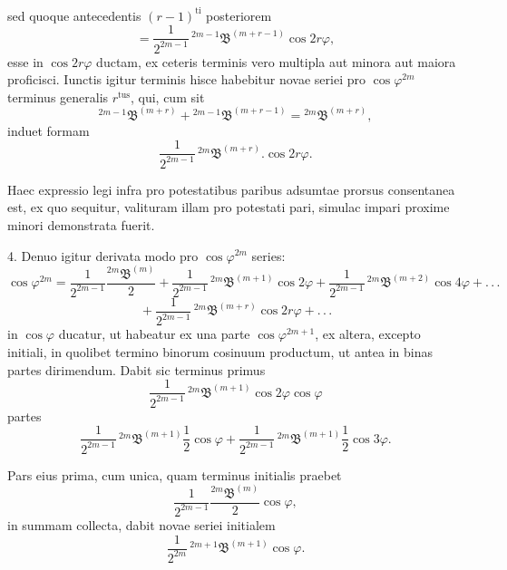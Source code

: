 sed quoque antecedentis $(r-1)^{\text{ti}}$ posteriorem
\[
= \frac{1}{2^{2m-1}}\,{}^{2m-1}\mathfrak{B}^{(m+r-1)}\cos 2r\varphi,
\]
esse in $\cos 2r\varphi$ ductam, ex ceteris terminis vero multipla aut minora
aut maiora proficisci. Iunctis igitur terminis hisce habebitur novae seriei
pro $\cos\varphi^{2m}$ terminus generalis $r^{\text{tus}}$, qui, cum sit
\[
{}^{2m-1}\mathfrak{B}^{(m+r)} + {}^{2m-1}\mathfrak{B}^{(m+r-1)} = {}^{2m}\mathfrak{B}^{(m+r)},
\]
induet formam
\[
\frac{1}{2^{2m-1}}\,{}^{2m}\mathfrak{B}^{(m+r)} . \cos 2r\varphi.
\]

\par\noindent Haec expressio legi infra pro potestatibus paribus adsumtae prorsus
consentanea est, ex quo sequitur, valituram illam pro potestati pari, simulac
impari proxime minori demonstrata fuerit.

4. Denuo igitur derivata modo pro $\cos\varphi^{2m}$ series:
\[
\cos\varphi^{2m} = \frac{1}{2^{2m-1}}\frac{{}^{2m}\mathfrak{B}^{(m)}}{2}
+ \frac{1}{2^{2m-1}}\,{}^{2m}\mathfrak{B}^{(m+1)}\cos 2\varphi
+ \frac{1}{2^{2m-1}}\,{}^{2m}\mathfrak{B}^{(m+2)}\cos 4\varphi + .\,.\,.
\]
\[
{} + \frac{1}{2^{2m-1}}\,{}^{2m}\mathfrak{B}^{(m+r)}\cos 2r\varphi + .\,.\,.
\]
in $\cos\varphi$ ducatur, ut habeatur ex una parte $\cos\varphi^{2m+1}$, ex
altera, excepto initiali, in quolibet termino binorum cosinuum productum, ut
antea in binas partes dirimendum. Dabit sic terminus primus
\[
\frac{1}{2^{2m-1}}\,{}^{2m}\mathfrak{B}^{(m+1)}\cos 2\varphi\cos\varphi
\]
partes
\[
\frac{1}{2^{2m-1}}\,{}^{2m}\mathfrak{B}^{(m+1)}\frac{1}{2}\cos\varphi
+ \frac{1}{2^{2m-1}}\,{}^{2m}\mathfrak{B}^{(m+1)}\frac{1}{2}\cos 3\varphi.
\]

\par\noindent Pars eius prima, cum unica, quam terminus initialis praebet
\[
\frac{1}{2^{2m-1}}\frac{{}^{2m}\mathfrak{B}^{(m)}}{2}\cos\varphi,
\]
in summam collecta, dabit novae seriei initialem
\[
\frac{1}{2^{2m}}\,{}^{2m+1}\mathfrak{B}^{(m+1)}\cos\varphi.
\]
